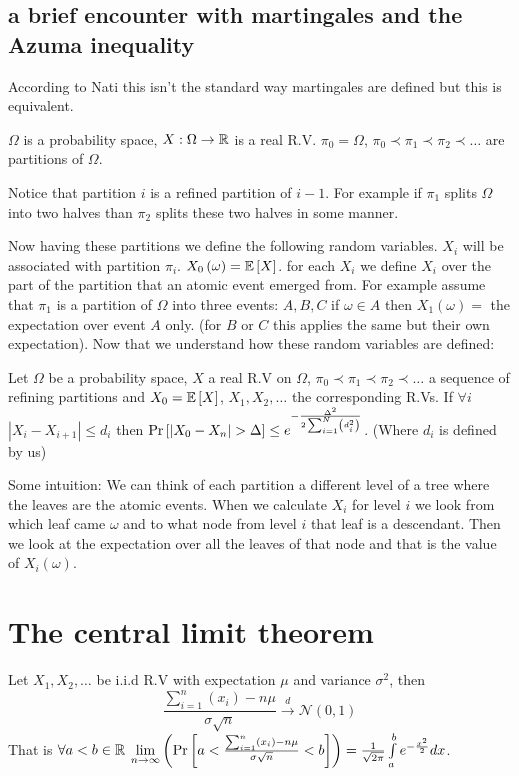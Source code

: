 \subsection{a brief encounter with martingales and the Azuma inequality}

According to Nati this isn't the standard way martingales are defined
but this is equivalent. 
\begin{definition}[Martingale]
 $\Omega$ is a probability space, $X:\Omega\to\mathbb{R}$ is a real R.V.
$\pi_{0}=\Omega$, $\pi_{0}\prec\pi_{1}\prec\pi_{2}\prec\dots$ are
partitions of $\Omega$. 

Notice that partition $i$ is a refined partition of $i-1$. For example
if $\pi_{1}$ splits $\Omega$ into two halves than $\pi_{2}$ splits
these two halves in some manner. 
\end{definition}

Now having these partitions we define the following random variables.
$X_{i}$ will be associated with partition $\pi_{i}$. $X_{0}\left(\omega\right)=\mathbb{E}\left[X\right]$.
for each $X_{i}$ we define $X_{i}$ over the part of the partition
that an atomic event emerged from. For example assume that $\pi_{1}$
is a partition of $\Omega$ into three events: $A,B,C$ if $\omega\in A$
then $X_{1}\left(\omega\right)=$ the expectation over event $A$
only. (for $B$ or $C$ this applies the same but their own expectation).
Now that we understand how these random variables are defined:
\begin{thm}
 Let $\Omega$ be a probability space, $X$ a real R.V on $\Omega$,
$\pi_{0}\prec\pi_{1}\prec\pi_{2}\prec\dots$ a sequence of refining
partitions and $X_{0}=\mathbb{E}\left[X\right]$, $X_{1},X_{2},\dots$ the corresponding
R.Vs. If $\forall i$ $\left|X_{i}-X_{i+1}\right|\le d_{i}$ then
$\p{\left|X_{0}-X_{n}\right|>\Delta}\le e^{-\frac{\Delta^{2}}{2\sum_{i=1}^{N}\left(d_{i}^{2}\right)}}$.
(Where $d_{i}$ is defined by us)
\end{thm}

Some intuition: We can think of each partition a different level of
a tree where the leaves are the atomic events. When we calculate $X_{i}$
for level $i$ we look from which leaf came $\omega$ and to what
node from level $i$ that leaf is a descendant. Then we look at the
expectation over all the leaves of that node and that is the value
of $X_{i}\left(\omega\right)$.


\section{The central limit theorem}
\begin{thm}
 Let $X_{1},X_{2},\dots$ be i.i.d R.V with expectation $\mu$ and
variance $\sigma^{2}$, then 
\[
\frac{\sum_{i=1}^{n}\left(x_{i}\right)-n\mu}{\sigma\sqrt{n}}\overset{d}{\to}\mathcal{N}\left(0,1\right)
\]
 That is $\forall a<b\in\mathbb{R}$ $\lim\limits _{n\to\infty}\left(\Pr\left[a<\frac{\sum_{i=1}^{n}\left(x_{i}\right)-n\mu}{\sigma\sqrt{n}}<b\right]\right)=\frac{1}{\sqrt{2\pi}}\int\limits _{a}^{b}e^{-\frac{x^{2}}{2}}dx$. 
\end{thm}

